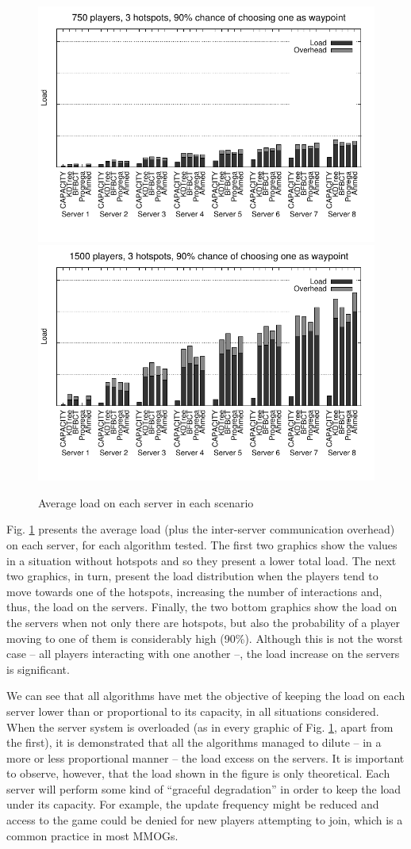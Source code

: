 \documentclass[acmjacm]{acmtrans2m}
\newcommand{\figurecaption}{Fig.}
\begin{document}
\begin{figure}[!t]
	\includegraphics[width=0.495\linewidth]{data/750players_prob90/distribution_750_90}
	\includegraphics[width=0.495\linewidth]{data/1500players_prob90/distribution_1500_90}

	\caption{Average load on each server in each scenario}
	\label{fig:distribution}
\end{figure}

\figurecaption{} \ref{fig:distribution} presents the average load (plus the inter-server communication overhead) on each server, for each algorithm tested. The first two graphics show the values in a situation without hotspots and so they present a lower total load. The next two graphics, in turn, present the load distribution when the players tend to move towards one of the hotspots, increasing the number of interactions and, thus, the load on the servers. Finally, the two bottom graphics show the load on the servers when not only there are hotspots, but also the probability of a player moving to one of them is considerably high (90\%). Although this is not the worst case -- all players interacting with one another --, the load increase on the servers is significant.

We can see that all algorithms have met the objective of keeping the load on each server lower than or proportional to its capacity, in all situations considered. When the server system is overloaded (as in every graphic of \figurecaption{} \ref{fig:distribution}, apart from the first), it is demonstrated that all the algorithms managed to dilute -- in a more or less proportional manner -- the load excess on the servers. It is important to observe, however, that the load shown in the figure is only theoretical. Each server will perform some kind of ``graceful degradation'' in order to keep the load under its capacity. For example, the update frequency might be reduced and access to the game could be denied for new players attempting to join, which is a common practice in most MMOGs.
\end{document}
